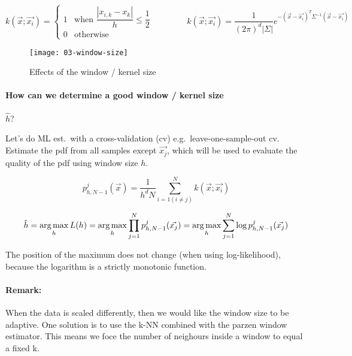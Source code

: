 \begin{equation*}
  k(\vec{x}; \vec{x_i}) = \begin{cases}
    1 &\text{when } \dfrac{|x_{i,k} - x_k|}{h} \le \dfrac{1}{2}\\
    0 &\text{otherwise}
  \end{cases}
  \qquad \qquad
  k(\vec{x}; \vec{x_i}) = \dfrac{1}{{(2\pi)}^d |\Sigma|} e^{-{(\vec{x} - \vec{x_i})}^T \Sigma^{-1}(\vec{x}-\vec{x_i})}
\end{equation*}

\begin{figure}[H]
  \centering
  \texttt{[image: 03-window-size]}
  \caption{Effects of the window / kernel size}
\end{figure}

\paragraph{How can we determine a good window / kernel size} $\hat{h}$?

Let's do ML est.\ with a cross-validation (cv) e.g.\ leave-one-sample-out cv. Estimate the pdf from all samples except $\vec{x_j}$, which will be used to evaluate the quality of the pdf using window size $h$.

\begin{equation*}
  p_{h,N-1}^j(\vec{x}) = \dfrac{1}{h^d N} \sum_{i=1 (i \neq j)}^N k(\vec{x}; \vec{x_i})
\end{equation*}

\begin{equation*}
  \hat{h} = \operatorname*{arg\,max}_h L(h) = \operatorname*{arg\,max}_h \prod_{j=1}^N p_{h,N-1}^j(\vec{x_j}) = \operatorname*{arg\,max}_h \sum_{j=1}^N \log p_{h,N-1}^j(\vec{x_j})
\end{equation*}

The position of the maximum does not change (when using log-likelihood), because the logarithm is a strictly monotonic function.

\paragraph{Remark:}
When the data is scaled differently, then we would like the window size to be adaptive. One solution is to use the k-NN combined with the parzen window estimator. This means we foce the number of neighours inside a window to equal a fixed k.
